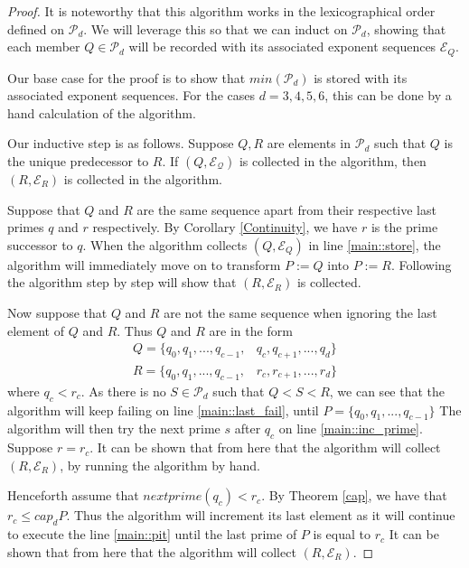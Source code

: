 \documentclass[../paper.tex]{subfiles}
\begin{document}
\begin{proof}
It is noteworthy that this algorithm works in the lexicographical
order defined on $\mathcal{P}_d$. We will leverage this so that we
can induct on $\mathcal{P}_d$, showing that each member $Q \in 
\mathcal{P}_d$ will be recorded with its associated exponent 
sequences $\mathcal{E}_Q$.

Our base case for the proof is to show that $min(\mathcal{P}_d)$
is stored with its associated exponent sequences. For the cases $d
= 3, 4, 5, 6$, this can be done by a hand calculation of the
algorithm.

Our inductive step is as follows. Suppose $Q, R$ are elements in 
$\mathcal{P}_d$ such that $Q$ is the unique predecessor to $R$. If
$(Q, \mathcal{E_Q})$ is collected in the algorithm, then $(R,
\mathcal{E}_R)$ is collected in the algorithm. 

Suppose that $Q$ and $R$ are the same sequence apart from 
their respective last primes $q$ and $r$ respectively. By Corollary 
\ref{Continuity}, we have $r$ is the prime successor to $q$. When 
the algorithm collects $(Q, \mathcal{E}_Q)$ in line \ref{main::store}, 
the algorithm will immediately move on to transform $P := Q$ into $P := R$.
Following the algorithm step by step will show that $(R, \mathcal{E}_R)$ 
is collected.

Now suppose that $Q$ and $R$ are not the same sequence when ignoring the 
last element of $Q$ and $R$. Thus $Q$ and $R$ are in the form 
\begin{equation}
\begin{split}
Q = \{q_0, q_1, ..., q_{c-1}, & q_c, q_{c+1}, ..., q_d\} \\
R = \{q_0, q_1, ..., q_{c-1}, & r_c, r_{c+1}, ..., r_d\}
\end{split}
\end{equation}
where $q_c < r_c$. As there is no $S \in \mathcal{P}_d$ such that
$Q < S < R$, we can see that the algorithm will keep failing on line
\ref{main::last_fail}, until $P = \{q_0, q_1, ..., q_{c-1}\}$
The algorithm will then try the next prime $s$ 
after $q_c$ on line \ref{main::inc_prime}. Suppose  $r = r_c$. It can
be shown that from here that the algorithm 
will collect $(R, \mathcal{E}_R)$, by running the algorithm by hand.

Henceforth assume that $nextprime(q_c) < r_c$. By Theorem \ref{cap}, 
we have that $r_c \leq cap_d{P}$. Thus the algorithm will increment its last
element as it will continue to execute the line \ref{main::pit}  
until the last prime of $P$ is equal to $r_c$ It can
be shown that from here that the algorithm 
will collect $(R, \mathcal{E}_R)$.
\end{proof}
\end{document}
